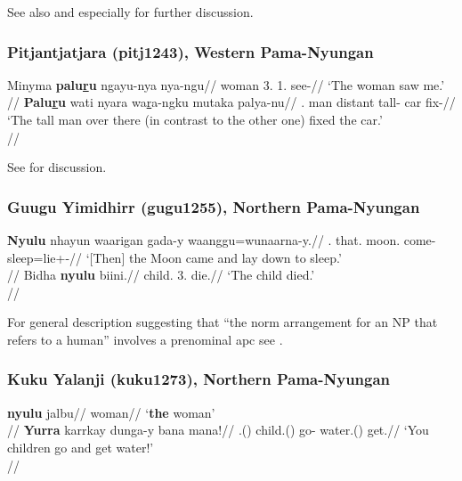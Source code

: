 See also \citealp[70]{reece1970} and especially \citealp[316f.]{hale1973} for further discussion.


\newpage

\subsubsection{Pitjantjatjara (pitj1243), Western Pama-Nyungan}

\pex
\a
\begingl
\gla Minyma \textbf{palu\underline{r}u} ngayu-nya nya-ngu//
\glb woman 3\Sg{}.\Nom{} 1\Sg{}.\Acc{} see-\Pst{}//
\glft `The woman saw me.' \\{\citep[31, (110)]{bowe1990}}//
\endgl
\a 
\begingl
\gla \textbf{Palu\underline{r}u} wati nyara wa\underline{r}a-ngku mutaka palya-nu//
\Sg{}.\Nom{} man distant tall-\Erg{} car fix-\Pst{}//
\glft `The tall man over there (in contrast to the other one) fixed the car.' \\{\citep[34, (114)]{bowe1990}}//
\endgl
\xe

See \citet[49--51]{bowe1990} for discussion.

\subsubsection{Guugu Yimidhirr (gugu1255), Northern Pama-Nyungan}

\pex
\a
\begingl
\gla \textbf{Nyulu} nhayun waarigan gada-y waanggu=wunaarna-y.//
\Sg.\Nom{} that.\Abs{} moon.\Abs{} come-\Pst{} sleep=lie+\Redup-\Pst//
\glft `[Then] the Moon came and lay down to sleep.'\\\citep[157, (423)]{haviland1979}//
\endgl
\a
\begingl
\gla Bidha \textbf{nyulu} biini.//
\glb child.\Abs{} 3\Sg.\Nom{} die.\Pst{}//
\glft `The child died.'\\\citep[157, (424a)]{haviland1979}//
\endgl
\xe

For general description suggesting that ``the norm arrangement for an NP that refers to a human'' involves a prenominal \gls{apc} see \citet[104]{haviland1979}.

\subsubsection{Kuku Yalanji (kuku1273), Northern Pama-Nyungan}

\pex
\a 
\begingl
\gla \textbf{nyulu} jalbu//
\Sg{} woman//
\glft `\textbf{the} woman'\\{\citep[after][202; gloss extrapolated]{patz2002}}//
\endgl
\a
\begingl
\gla \textbf{Yurra} karrkay dunga-y bana mana!//
\Pl{}.\Nom{}(\Sarg{}) child.\Abs{}(\Sarg{}) go-\Imp{} water.\Abs{}(\Obj{}) get.\Imp{}//
\glft `You children go and get water!' \\{\citep[after][203, (620)]{patz2002}}//
\endgl
\xe

